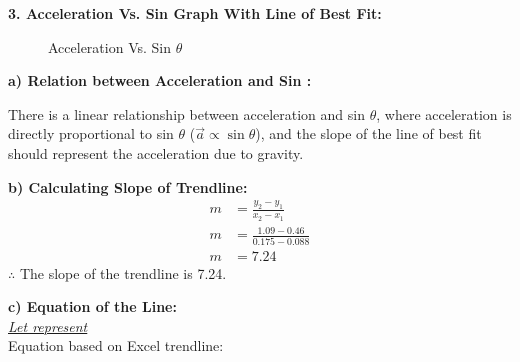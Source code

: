\documentclass[12pt,letterpaper]{article}
\newcommand\tab[1][1cm]{\hspace*{#1}}
\begin{document}
\noindent
\textbf{3. Acceleration Vs. Sin \bm{$\theta$} Graph With Line of Best Fit:}
\begin{figure}[H]
	\caption{Acceleration Vs. Sin $\theta$\label{figure2}}
	\vspace{-4mm}
\end{figure}
\vspace{-4mm}

\noindent
\textbf{\tab a) Relation between Acceleration and Sin \bm{$\theta$}:}

\noindent
\tab There is a linear relationship between acceleration and sin $\theta$, where acceleration is \tab directly proportional to sin $\theta$ ($\vec{a}\propto \sin\theta$), and the slope of the line of best fit should \tab represent the acceleration due to gravity.

\newpage

\noindent
\textbf{\tab b) Calculating Slope of Trendline:}
\vspace{-4mm}
\[
	\begin{aligned}
		m & = \frac{y_{2}-y_{1}}{x_{2}-x_{1}} \\
		m & =\frac{1.09-0.46}{0.175-0.088}    \\
		m & =7.24
	\end{aligned}
\]
\noindent
\tab $\therefore$ The slope of the trendline is 7.24.

\vspace{4mm}
\noindent
\textbf{\tab c) Equation of the Line:}\\
\noindent
\tab \underline{\textit{Let  represent \boldmath{$\sin \theta$}}}\\
\tab Equation based on Excel trendline: 
\end{document}
